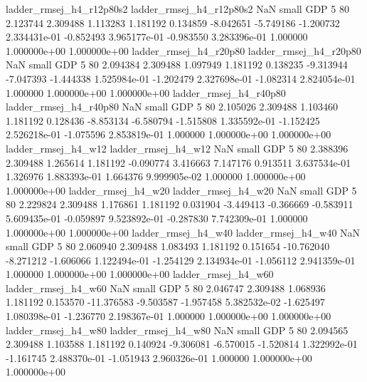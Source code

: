 ladder_rmsej_h4_r12p80s2 ladder_rmsej_h4_r12p80s2                   NaN      small      GDP                 5 80 2.123744       2.309488 1.113283       1.181192    0.134859     -8.042651     -5.749186    -1.200732   2.334431e-01 -0.852493 3.965177e-01    -0.983550   3.283396e-01            1.000000    1.000000e+00        1.000000e+00
  ladder_rmsej_h4_r20p80   ladder_rmsej_h4_r20p80                   NaN      small      GDP                 5 80 2.094384       2.309488 1.097949       1.181192    0.138235     -9.313944     -7.047393    -1.444338   1.525984e-01 -1.202479 2.327698e-01    -1.082314   2.824054e-01            1.000000    1.000000e+00        1.000000e+00
  ladder_rmsej_h4_r40p80   ladder_rmsej_h4_r40p80                   NaN      small      GDP                 5 80 2.105026       2.309488 1.103460       1.181192    0.128436     -8.853134     -6.580794    -1.515808   1.335592e-01 -1.152425 2.526218e-01    -1.075596   2.853819e-01            1.000000    1.000000e+00        1.000000e+00
     ladder_rmsej_h4_w12      ladder_rmsej_h4_w12                   NaN      small      GDP                 5 80 2.388396       2.309488 1.265614       1.181192   -0.090774      3.416663      7.147176     0.913511   3.637534e-01  1.326976 1.883393e-01     1.664376   9.999905e-02            1.000000    1.000000e+00        1.000000e+00
     ladder_rmsej_h4_w20      ladder_rmsej_h4_w20                   NaN      small      GDP                 5 80 2.229824       2.309488 1.176861       1.181192    0.031904     -3.449413     -0.366669    -0.583911   5.609435e-01 -0.059897 9.523892e-01    -0.287830   7.742309e-01            1.000000    1.000000e+00        1.000000e+00
     ladder_rmsej_h4_w40      ladder_rmsej_h4_w40                   NaN      small      GDP                 5 80 2.060940       2.309488 1.083493       1.181192    0.151654    -10.762040     -8.271212    -1.606066   1.122494e-01 -1.254129 2.134934e-01    -1.056112   2.941359e-01            1.000000    1.000000e+00        1.000000e+00
     ladder_rmsej_h4_w60      ladder_rmsej_h4_w60                   NaN      small      GDP                 5 80 2.046747       2.309488 1.068936       1.181192    0.153570    -11.376583     -9.503587    -1.957458   5.382532e-02 -1.625497 1.080398e-01    -1.236770   2.198367e-01            1.000000    1.000000e+00        1.000000e+00
     ladder_rmsej_h4_w80      ladder_rmsej_h4_w80                   NaN      small      GDP                 5 80 2.094565       2.309488 1.103588       1.181192    0.140924     -9.306081     -6.570015    -1.520814   1.322992e-01 -1.161745 2.488370e-01    -1.051943   2.960326e-01            1.000000    1.000000e+00        1.000000e+00
